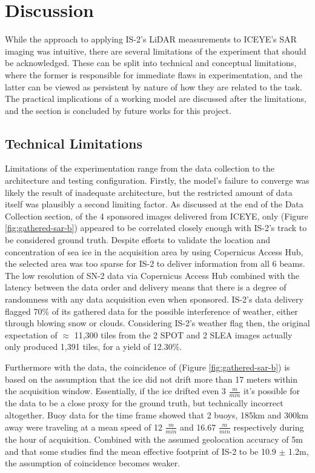 \chapter{Discussion}
\label{sec:Discussion}
While the approach to applying IS-2's LiDAR measurements to ICEYE's SAR imaging was intuitive, there are several limitations of the experiment that should be acknowledged. These can be split into technical and conceptual limitations, where the former is responsible for immediate flaws in experimentation, and the latter can be viewed as persistent by nature of how they are related to the task. The practical implications of a working model are discussed after the limitations, and the section is concluded by future works for this project.

\section{Technical Limitations}
Limitations of the experimentation range from the data collection to the architecture and testing configuration. Firstly, the model's failure to converge was likely the result of inadequate architecture, but the restricted amount of data itself was plausibly a second limiting factor. As discussed at the end of the Data Collection section, of the 4 sponsored images delivered from ICEYE, only (Figure \ref{fig:gathered-sar-b}) appeared to be correlated closely enough with IS-2's track to be considered ground truth. Despite efforts to validate the location and concentration of sea ice in the acquisition area by using Copernicus Access Hub, the selected area was too sparse for IS-2 to deliver information from all 6 beams. The low resolution of SN-2 data via Copernicus Access Hub combined with the latency between the data order and delivery means that there is a degree of randomness with any data acquisition even when sponsored. IS-2's data delivery flagged 70$\%$ of its gathered data for the possible interference of weather, either through blowing snow or clouds. Considering IS-2's weather flag then, the original expectation of $\approx$ 11,300 tiles from the 2 SPOT and 2 SLEA images actually only produced 1,391 tiles, for a yield of 12.30$\%$.

Furthermore with the data, the coincidence of (Figure \ref{fig:gathered-sar-b}) is based on the assumption that the ice did not drift more than 17 meters within the acquisition window. Essentially, if the ice drifted even 3 $\frac{m}{min}$ it's possible for the data to be a close proxy for the ground truth, but technically incorrect altogether. Buoy data for the time frame showed that 2 buoys, 185km and 300km away were traveling at a mean speed of 12 $\frac{m}{min}$ and 16.67 $\frac{m}{min}$ respectively during the hour of acquisition. Combined with the assumed geolocation accuracy of 5m \cite{ICESat-2-Horizontal-Accuracy} and that some studies find the mean effective footprint of IS-2 to be 10.9 $\pm$ 1.2m\cite{icesatfootprintdiameter}, the assumption of coincidence becomes weaker.

